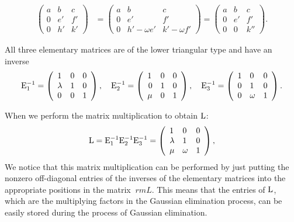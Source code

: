 \documentclass[
  letterpaper,
  DIV=11,
  numbers=noendperiod]{scrartcl}
\theoremstyle{remark}
\begin{document}
\[\begin{aligned}
\left(\begin{array}{rrr}
a & b & c\\
0 & e' & f' \\
0 & h' & k'
\end{array}\right) &=
\left(\begin{array}{rrr}
a & b & c \\
0 & e' & f' \\
0 & h'-\omega e' & k'-\omega f'
\end{array}\right) =
\left(\begin{array}{rrr}
a & b & c \\
0 & e' & f' \\
0 & 0 & k''
\end{array}\right).
\end{aligned}\]

All three elementary matrices are of the lower triangular type and have
an inverse \[{\rm E}_1^{-1} =\left(
{{\begin{array}{rrr}
 1 \hfill & 0 \hfill & 0 \hfill \\
 {\lambda } \hfill & 1 \hfill & 0 \hfill \\
 0 \hfill & 0 \hfill & 1 \hfill \\
\end{array} }} \right), \quad  {\rm E}_2^{-1} =\left(
{{\begin{array}{rrr}
 1 \hfill & 0 \hfill & 0 \hfill \\
 0  & 1 \hfill & 0 \hfill \\
 {\mu } \hfill & 0 \hfill & 1 \hfill \\
\end{array} }} \right), \quad   {\rm E}_3^{-1} =\left( 
\begin{array}{rrr}
 1 \hfill & 0 \hfill & 0 \hfill \\
 0  & 1 \hfill & 0 \hfill \\
 0  &  \omega \hfill & 1 \hfill \\
\end{array} \right)  .\]

When we perform the matrix multiplication to obtain \({\rm L}\):
\[{\rm L} ={\rm E}_{1}^{-1}  {\rm E}_{2}^{- 1} {\rm E}_{3}^{-1}  =\left(
\begin{array}{rrr}
 1 \hfill & 0 \hfill & 0 \hfill \\
 \lambda & 1 \hfill & 0 \hfill \\
 \mu &  \omega \hfill & 1 \hfill \\
\end{array} \right),\] We notice that this matrix multiplication can be
performed by just putting the nonzero off-diagonal entries of the
inverses of the elementary matrices into the appropriate positions in
the matrix \({\ rm L}\). This means that the entries of \({\rm L}\),
which are the multiplying factors in the Gaussian elimination process,
can be easily stored during the process of Gaussian elimination.
\end{document}
